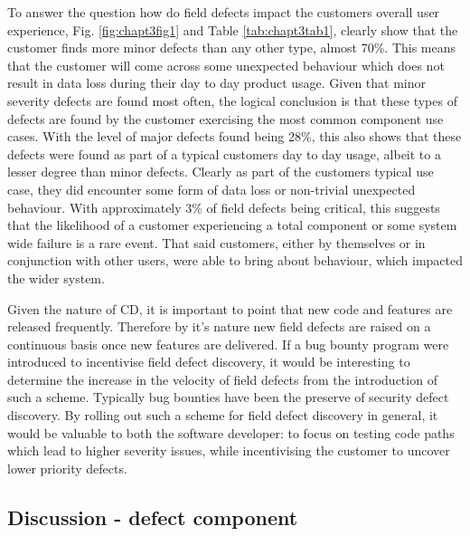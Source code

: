 To answer the question how do field defects impact the customers overall user experience, Fig. \ref{fig:chapt3fig1} and Table \ref{tab:chapt3tab1}, clearly show that the customer finds more minor defects than any other type, almost 70\%. This means that the customer will come across some unexpected behaviour which does not result in data loss during their day to day product usage. Given that minor severity defects are found most often, the logical conclusion is that these types of defects are found by the customer exercising the most common component use cases. With the level of major defects found being 28\%, this also shows that these defects were found as part of a typical customers day to day usage, albeit to a lesser degree than minor defects. Clearly as part of the customers typical use case, they did encounter some form of data loss or non-trivial unexpected behaviour. With approximately 3\% of field defects being critical, this suggests that the likelihood of a customer experiencing a total component or some system wide failure is a rare event. That said customers, either by themselves or in conjunction with other users, were able to bring about behaviour, which impacted the wider system. \par

Given the nature of CD, it is important to point that new code and features are released frequently. Therefore by it's nature new field defects are raised on a continuous basis once new features are delivered. If a bug bounty program were introduced to incentivise field defect discovery, it would be interesting to determine the increase in the velocity of field defects from the introduction of such a scheme. Typically bug bounties have been the preserve of security defect discovery. By rolling out such a scheme for field defect discovery in general, it would be valuable to both the software developer: to focus on testing code paths which lead to higher severity issues, while incentivising the customer to uncover lower priority defects.

\subsection{Discussion - defect component}

